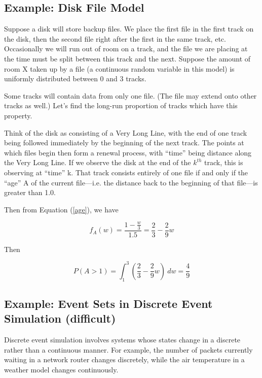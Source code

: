 \subsection{Example:  Disk File Model}

Suppose a disk will store backup files.  We place the first file in the
first track on the disk, then the second file right after the first in
the same track, etc.  Occasionally we will run out of room on a track,
and the file we are placing at the time must be split between this track
and the next.  Suppose the amount of room X taken up by a file (a
continuous random variable in this model) is uniformly distributed
between 0 and 3 tracks.  

Some tracks will contain data from only one file.  (The file may extend
onto other tracks as well.)  Let's find the long-run proportion of
tracks which have this property.  

Think of the disk as consisting of a Very Long Line, with the
end of one track being followed immediately by the beginning of the next
track.  The points at which files begin then form a renewal process,
with ``time'' being distance along the Very Long Line.  If we observe
the disk at the end of the $k^{th}$ track, this is observing at ``time''
k.  That track consists entirely of one file if and only if the ``age''
A of the current file---i.e. the distance back to the beginning of that
file---is greater than 1.0.

Then from Equation (\ref{age}), we have

\begin{equation}
f_A(w) = \frac{1-\frac{w}{3}}{1.5} = \frac{2}{3} - \frac{2}{9} w
\end{equation}

Then

\begin{equation}
P(A > 1) = \int_{1}^{3} \left (\frac{2}{3} - \frac{2}{9} w \right) ~ dw
= \frac{4}{9}
\end{equation}

\subsection{Example:  Event Sets in Discrete Event Simulation
(difficult)}

Discrete event simulation involves systems whose states change in a
discrete rather than a continuous manner.  For example, the number of
packets currently waiting in a network router changes discretely, while
the air temperature in a weather model changes continuously.

